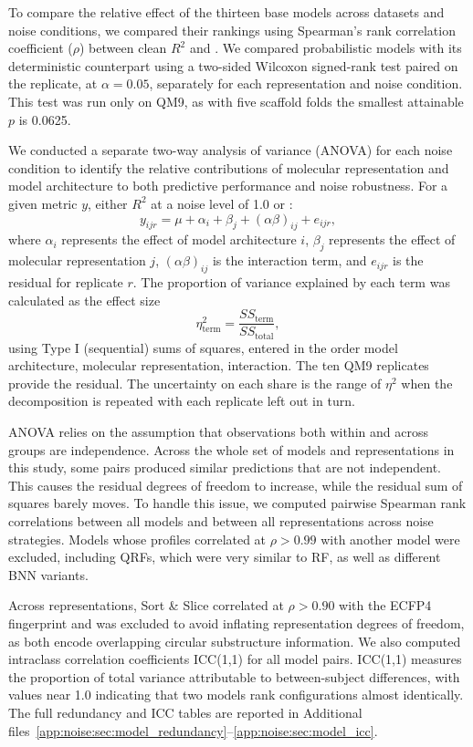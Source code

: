 To compare the relative effect of the thirteen base models across datasets and noise conditions, we compared their rankings using Spearman's rank correlation coefficient ($\rho$) between clean $R^2$ and \aucnorm. We compared probabilistic models  with its deterministic counterpart using a two-sided Wilcoxon signed-rank test paired on the replicate, at $\alpha = 0.05$, separately for each representation and noise condition. This test was run only on QM9, as with five scaffold folds the
smallest attainable $p$ is 0.0625.

We conducted a separate two-way analysis of variance (ANOVA) for each noise condition to identify the
relative contributions of molecular representation and model architecture to both predictive
performance and noise robustness. For a given metric $y$, either $R^2$ at a noise level of 1.0 or
\aucnorm:
\begin{equation}
y_{ijr} = \mu + \alpha_i + \beta_j + (\alpha\beta)_{ij} + e_{ijr},
\end{equation}
where $\alpha_i$ represents the effect of model architecture $i$, $\beta_j$ represents the effect of
molecular representation $j$, $(\alpha\beta)_{ij}$ is the interaction term, and $e_{ijr}$ is the
residual for replicate $r$. The proportion of variance explained by each term was calculated as the
effect size
\begin{equation}
\eta^2_{\text{term}} = \frac{SS_{\text{term}}}{SS_{\text{total}}},
\end{equation}
using Type I (sequential) sums of squares, entered in the order model architecture, molecular
representation, interaction. The ten QM9 replicates provide the residual. The uncertainty on each share is the range of $\eta^2$ when the decomposition is repeated with each replicate left out in turn. 

ANOVA relies on the assumption that observations both within and across groups are independence. Across the whole set of models and representations in this study, some pairs produced similar predictions that are not independent. This causes the residual degrees of freedom to increase, while the residual sum of squares barely moves. To handle this issue, we computed pairwise Spearman rank correlations between all models and between all representations across noise strategies. Models whose profiles correlated at $\rho > 0.99$ with another model were excluded, including QRFs, which were very similar to RF, as well as different BNN variants. 

Across representations, Sort \& Slice correlated at $\rho > 0.90$ with the ECFP4 fingerprint and was excluded to avoid inflating representation degrees of freedom, as both encode overlapping circular substructure information. We also computed intraclass correlation coefficients ICC(1,1) for all model pairs. ICC(1,1) measures the proportion of total variance attributable to between-subject differences, with values near 1.0 indicating that two models rank configurations almost identically. The full redundancy and ICC tables are reported in Additional files~\ref{app:noise:sec:model_redundancy}--\ref{app:noise:sec:model_icc}.

